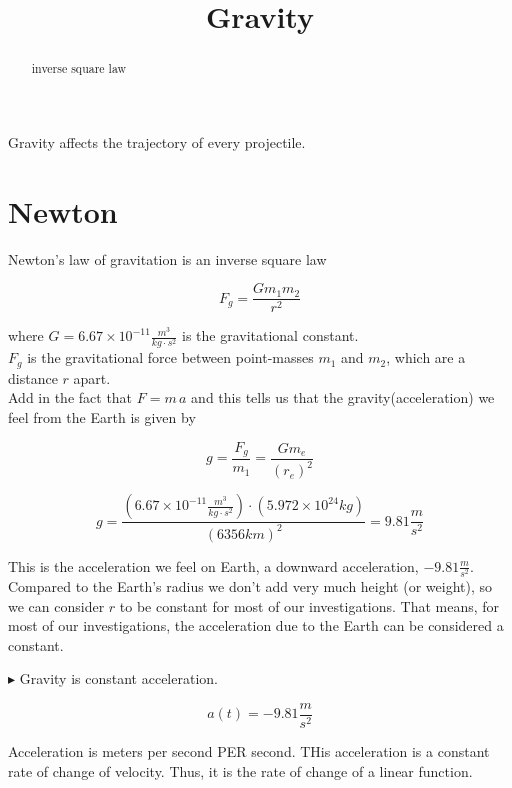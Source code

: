 \documentclass{ximera}
\title{Gravity}
\begin{document}
\begin{abstract}
inverse square law
\end{abstract}
\maketitle




Gravity affects the trajectory of every projectile.




\section{Newton}

Newton's law of gravitation is an inverse square law

\[ F_g = \frac{G m_1 m_2}{r^2}    \]




where $G = 6.67 \times 10^{-11} \frac{m^3}{kg \cdot s^2}$ is the gravitational constant. \\


$F_g$ is the gravitational force between point-masses $m_1$ and $m_2$, which are a distance $r$ apart. \\



Add in the fact that $F = m \, a$ and this tells us that the gravity(acceleration) we feel from the Earth is given by


\[ g = \frac{F_g}{m_1}  = \frac{G m_e}{(r_e)^2}    \]


\[ g = \frac{(6.67 \times 10^{-11} \frac{m^3}{kg \cdot s^2}) \cdot (5.972 \times 10^{24} kg)}{(6356 km)^2} = 9.81 \frac{m}{s^2}   \]


This is the acceleration we feel on Earth, a downward acceleration, $-9.81 \frac{m}{s^2}$.  Compared to the Earth's radius we don't add very much height (or weight), so we can consider $r$ to be constant for most of our investigations.  That means, for most of our investigations, the acceleration due to the Earth can be considered a constant.




$\blacktriangleright$ Gravity is constant acceleration.


\[ a(t) = -9.81 \frac{m}{s^2}  \]



Acceleration is meters per second PER second.  THis acceleration is a constant rate of change of velocity.  Thus, it is the rate of change of a linear function.
\end{document}
